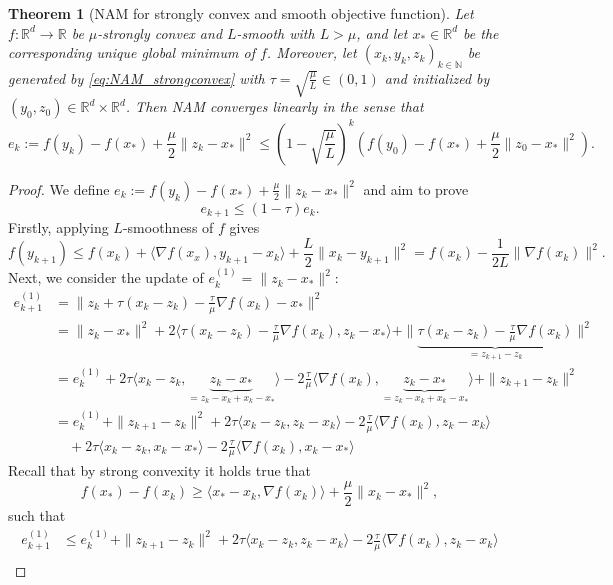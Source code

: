 \documentclass[10pt,a4paper]{amsart}
\newtheorem{thm}{Theorem}
\newcommand{\N}{\mathbb{N}}
\newcommand{\R}{\mathbb{R}}
\begin{document}
\begin{thm}[NAM for strongly convex and smooth objective function] 
Let $f:\R^d\to\R$ be $\mu$-strongly convex and $L$-smooth with $L>\mu$, and let $x_\ast\in\R^d$ be the corresponding unique global minimum of $f$. Moreover, let $(x_k,y_k,z_k)_{k\in\N}$ be generated by \eqref{eq:NAM_strongconvex} with $\tau = \sqrt{\frac{\mu}{L}}\in(0,1)$ and initialized by $(y_0,z_0)\in\R^d\times\R^d$. Then {NAM} converges linearly in the sense that
\[e_k := f(y_k)-f(x_\ast) + \frac{\mu}{2}\|z_k-x_\ast\|^2 \le \left(1-\sqrt{\frac{\mu}{L}}\right)^k \left(f(y_0)-f(x_\ast) +\frac{\mu}{2}\|z_0-x_\ast\|^2\right). \]
\end{thm}

\begin{proof}
We define $e_k := f(y_k)-f(x_\ast) + \frac{\mu}{2}\|z_k-x_\ast\|^2$ and aim to prove 
\[e_{k+1}\le (1-\tau) e_k. \]
Firstly, applying $L$-smoothness of $f$ gives
\begin{equation}\label{eq:NAM_strongconvex_aux1}
f(y_{k+1}) \le f(x_k) + \langle \nabla f(x_x), y_{k+1}-x_k\rangle + \frac{L}{2}\|x_k-y_{k+1}\|^2 = f(x_k) -\frac{1}{2L}\|\nabla f(x_k)\|^2.
\end{equation}
Next, we consider the update of $e_k^{(1)} = \|z_k-x_\ast\|^2$:
\begin{align*}
e_{k+1}^{(1)} &= \|z_k +\tau(x_k-z_k) -\frac{\tau}{\mu}\nabla f(x_k) - x_\ast\|^2\\
&= \|z_k-x_\ast\|^2 + 2\langle \tau (x_k-z_k)-\frac{\tau}{\mu}\nabla f(x_k), z_k - x_\ast\rangle + \|\underbrace{\tau(x_k-z_k) - \frac{\tau}{\mu}\nabla f(x_k)}_{=z_{k+1}-z_k} \|^2\\
&= e_k^{(1)} + 2\tau \langle x_k-z_k,\underbrace{z_k-x_\ast}_{=z_k-x_k+x_k-x_\ast}\rangle - 2\frac{\tau}{\mu} \langle \nabla f(x_k),\underbrace{z_k-x_\ast}_{=z_k-x_k+x_k-x_\ast}\rangle +\|z_{k+1}-z_k\|^2\\
&= e_k^{(1)}+ \|z_{k+1}-z_k\|^2 + 2\tau \langle x_k-z_k,z_k-x_k\rangle - 2\frac{\tau}{\mu}\langle \nabla f(x_k),z_k-x_k\rangle \\
&\quad+2\tau \langle x_k-z_k,x_k-x_\ast\rangle -2\frac{\tau}{\mu}\langle \nabla f(x_k), x_k-x_\ast\rangle 
\end{align*}
Recall that by strong convexity it holds true that
\[f(x_\ast)-f(x_k)\ge \langle x_\ast-x_k,\nabla f(x_k)\rangle + \frac{\mu}2 \|x_k-x_\ast\|^2, \]
such that
\begin{align*}
e_{k+1}^{(1)} &\le e_k^{(1)}+ \|z_{k+1}-z_k\|^2 + 2\tau \langle x_k-z_k,z_k-x_k\rangle - 2\frac{\tau}{\mu}\langle \nabla f(x_k),z_k-x_k\rangle \\

\end{align*}
\end{proof}
\end{document}
